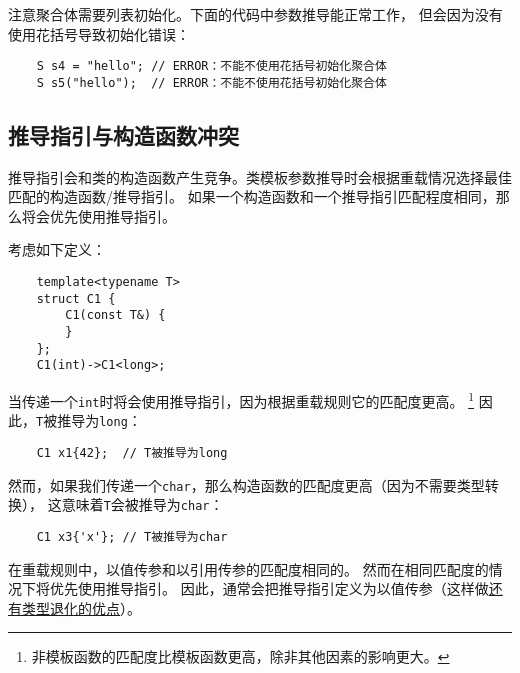 注意聚合体需要列表初始化。下面的代码中参数推导能正常工作，
但会因为没有使用花括号导致初始化错误：
\begin{lstlisting}
    S s4 = "hello"; // ERROR：不能不使用花括号初始化聚合体
    S s5("hello");  // ERROR：不能不使用花括号初始化聚合体
\end{lstlisting}

\subsection{推导指引与构造函数冲突}
推导指引会和类的构造函数产生竞争。类模板参数推导时会根据重载情况选择最佳匹配的构造函数/推导指引。
如果一个构造函数和一个推导指引匹配程度相同，那么将会优先使用推导指引。

考虑如下定义：
\begin{lstlisting}
    template<typename T>
    struct C1 {
        C1(const T&) {
        }
    };
    C1(int)->C1<long>;
\end{lstlisting}
当传递一个\texttt{int}时将会使用推导指引，因为根据重载规则它的匹配度更高。
\footnote{非模板函数的匹配度比模板函数更高，除非其他因素的影响更大。}
因此，\texttt{T}被推导为\texttt{long}：
\begin{lstlisting}
    C1 x1{42};  // T被推导为long
\end{lstlisting}
然而，如果我们传递一个\texttt{char}，那么构造函数的匹配度更高（因为不需要类型转换），
这意味着\texttt{T}会被推导为\texttt{char}：
\begin{lstlisting}
    C1 x3{'x'}; // T被推导为char
\end{lstlisting}
在重载规则中，以值传参和以引用传参的匹配度相同的。
然而在相同匹配度的情况下将优先使用推导指引。
因此，通常会把推导指引定义为以值传参（这样做\hyperref[ch9.2.1]{还有类型退化的优点}）。

